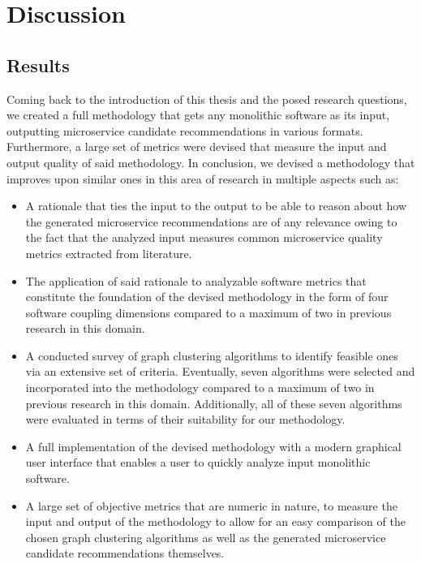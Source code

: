 \documentclass[12pt,a4paper]{report}
\begin{document}
\chapter{Discussion} \label{chap:discussion}

\section{Results}

Coming back to the introduction of this thesis and the posed research questions,
we created a full methodology that gets any monolithic software as its input,
outputting microservice candidate recommendations in various formats.
Furthermore, a large set of metrics were devised that measure the input and
output quality of said methodology.
In conclusion, we devised a methodology that improves upon similar ones in
this area of research in multiple aspects such as:

\begin{itemize}
    \item A rationale that ties the input to the output to be able to reason
    about how the generated microservice recommendations are of any relevance
    owing to the fact that the analyzed input measures common microservice
    quality metrics extracted from literature.
    \item The application of said rationale to analyzable software metrics
    that constitute the foundation of the devised methodology in the form
    of four software coupling dimensions compared to a maximum
    of two in previous research in this domain.
    \item A conducted survey of graph clustering algorithms to identify feasible
    ones via an extensive set of criteria. Eventually, seven algorithms were
    selected and incorporated into the methodology compared to a maximum
    of two in previous research in this domain. Additionally, all of these seven
    algorithms were evaluated in terms of their suitability for our methodology.
    \item A full implementation of the devised methodology with a modern
    graphical user interface that enables a user to quickly analyze input
    monolithic software.
    \item A large set of objective metrics that are numeric in nature,
    to measure the input and output of the methodology to allow for an
    easy comparison of the chosen graph clustering algorithms as well as
    the generated microservice candidate recommendations themselves.
\end{itemize}
\end{document}
